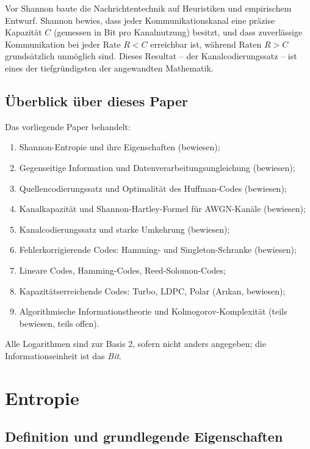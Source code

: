 \documentclass[12pt,a4paper]{amsart}
\theoremstyle{definition}
\theoremstyle{remark}
\begin{document}
Vor Shannon baute die Nachrichtentechnik auf Heuristiken und empirischem
Entwurf. Shannon bewies, dass jeder Kommunikationskanal eine präzise Kapazität
$C$ (gemessen in Bit pro Kanalnutzung) besitzt, und dass zuverlässige
Kommunikation bei jeder Rate $R < C$ erreichbar ist, während Raten $R > C$
grundsätzlich unmöglich sind. Dieses Resultat -- der Kanalcodierungssatz -- ist
eines der tiefgründigsten der angewandten Mathematik.

\subsection*{Überblick über dieses Paper}

Das vorliegende Paper behandelt:
\begin{enumerate}[label=(\arabic*)]
  \item Shannon-Entropie und ihre Eigenschaften (bewiesen);
  \item Gegenseitige Information und Datenverarbeitungsungleichung (bewiesen);
  \item Quellencodierungssatz und Optimalität des Huffman-Codes (bewiesen);
  \item Kanalkapazität und Shannon-Hartley-Formel für AWGN-Kanäle (bewiesen);
  \item Kanalcodierungssatz und starke Umkehrung (bewiesen);
  \item Fehlerkorrigierende Codes: Hamming- und Singleton-Schranke (bewiesen);
  \item Lineare Codes, Hamming-Codes, Reed-Solomon-Codes;
  \item Kapazitätserreichende Codes: Turbo, LDPC, Polar (Ar\i{}kan, bewiesen);
  \item Algorithmische Informationstheorie und Kolmogorov-Komplexität
        (teils bewiesen, teils offen).
\end{enumerate}

Alle Logarithmen sind zur Basis 2, sofern nicht anders angegeben; die
Informationseinheit ist das \emph{Bit}.

\section{Entropie}

\subsection{Definition und grundlegende Eigenschaften}
\end{document}
